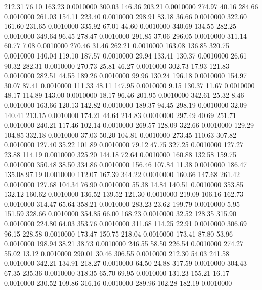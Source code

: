  212.31   76.10  163.23   0.0010000
 300.03  146.36  203.21   0.0010000
 274.97   40.16  284.66   0.0010000
 261.03  154.11  223.40   0.0010000
 298.91   83.18   36.66   0.0010000
 322.60  161.60  231.65   0.0010000
 335.92   67.01   44.60   0.0010000
 340.69  134.55  282.25   0.0010000
 349.64   96.45  278.47   0.0010000
 291.85   37.06  296.05   0.0010000
 311.14   60.77    7.08   0.0010000
 270.46   31.46  262.21   0.0010000
 163.08  136.85  320.75   0.0010000
 140.04  119.10  187.57   0.0010000
  29.94  133.41  130.37   0.0010000
  26.61   90.32  282.31   0.0010000
 270.73   25.81   46.27   0.0010000
 302.73   17.93  121.83   0.0010000
 282.51   44.55  189.26   0.0010000
  99.96  130.24  196.18   0.0010000
 154.97   30.07   87.41   0.0010000
 111.33   48.11  147.95   0.0010000
   9.15  130.37   11.67   0.0010000
  48.17  114.89  143.00   0.0010000
  18.17   96.46  201.95   0.0010000
 342.61   25.32    8.46   0.0010000
 163.66  120.13  142.82   0.0010000
 189.37   94.45  298.19   0.0010000
  32.09  140.41  213.15   0.0010000
 174.21   44.64  214.83   0.0010000
 297.49   40.69  251.71   0.0010000
 240.21  117.46  102.14   0.0010000
 269.57  128.09  322.66   0.0010000
 129.29  104.85  332.18   0.0010000
  37.03   50.20  104.81   0.0010000
 273.45  110.63  307.82   0.0010000
 127.40   35.22  101.89   0.0010000
  79.12   47.75  327.25   0.0010000
 127.27   23.88  114.19   0.0010000
 325.20  144.18   72.64   0.0010000
 160.88  132.58  159.75   0.0010000
 350.48   38.50  334.86   0.0010000
 156.46  107.84   11.38   0.0010000
 186.47  135.08   97.19   0.0010000
 112.07  167.39  344.22   0.0010000
 160.66  147.68  261.42   0.0010000
 127.68  104.34   76.90   0.0010000
  55.38   14.84  140.51   0.0010000
 353.85  132.12  160.62   0.0010000
 136.52  139.52  121.30   0.0010000
 219.09  106.16  162.73   0.0010000
 314.47   65.64  358.21   0.0010000
 283.23   23.62  199.79   0.0010000
   5.95  151.59  328.66   0.0010000
 354.85   66.00  168.23   0.0010000
  32.52  128.35  315.90   0.0010000
 224.80   64.03  353.76   0.0010000
 311.68  114.25   22.91   0.0010000
 306.69   96.15  228.58   0.0010000
 173.47  150.75  218.04   0.0010000
 173.41   87.80   53.96   0.0010000
 198.94   38.21   38.73   0.0010000
 246.55   58.50  226.54   0.0010000
 274.27   55.02   13.12   0.0010000
 290.01   30.46  306.55   0.0010000
 212.30   54.03  241.58   0.0010000
 342.21  134.91  218.27   0.0010000
  64.50   24.88  317.59   0.0010000
 304.43   67.35  235.36   0.0010000
 318.35   65.70   69.95   0.0010000
 131.23  155.21   16.17   0.0010000
 230.52  109.86  316.16   0.0010000
 289.96  102.28  182.19   0.0010000
